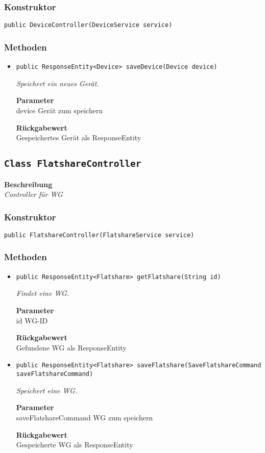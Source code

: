     \subsubsection*{Konstruktor}
    \texttt{public DeviceController(DeviceService service)}
    \subsubsection*{Methoden}
    \begin{itemize}
    	\item{\texttt{public ResponseEntity<Device> saveDevice(Device device)}}
    	
    	\textit{Speichert ein neues Gerät.}
    	
    	\textbf{Parameter} \\
    	device Gerät zum speichern
    	
    	\textbf{Rückgabewert} \\
    	Gespeichertes Gerät als ResponseEntity
    \end{itemize}
    \subsection{\texttt{Class FlatshareController}}
    \textbf{Beschreibung} \\
    \textit{Controller für WG}
    \subsubsection*{Konstruktor}
    \texttt{public FlatshareController(FlatshareService service)}
    \subsubsection*{Methoden}
    \begin{itemize}
    	\item{\texttt{public ResponseEntity<Flatshare> getFlatshare(String id)}}
    	
    	\textit{Findet eine WG.}
    	
    	\textbf{Parameter} \\
    	id WG-ID
    	
    	\textbf{Rückgabewert} \\
    	Gefundene WG als ResponseEntity        \item{\texttt{public ResponseEntity<Flatshare> saveFlatshare(SaveFlatshareCommand saveFlatshareCommand)}}
    	
    	\textit{Speichert eine WG.}
    	
    	\textbf{Parameter} \\
    	saveFlatshareCommand WG zum speichern
    	
    	\textbf{Rückgabewert} \\
    	Gespeicherte WG als ResponseEntity
    \end{itemize}
